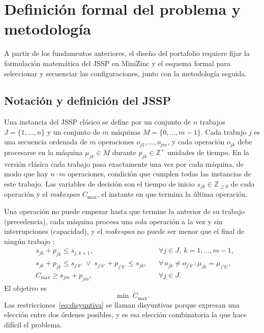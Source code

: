 \chapter{Definición formal del problema y metodología}
\label{cap:problema}

A partir de los fundamentos anteriores, el diseño del portafolio requiere fijar
la formulación matemática del JSSP en MiniZinc y el esquema formal para
seleccionar y secuenciar las configuraciones, junto con la metodología seguida.

\section{Notación y definición del JSSP}
\label{sec:notacion}

Una instancia del JSSP clásico se define por un conjunto de $n$ trabajos
$J = \{1, \dots, n\}$ y un conjunto de $m$ máquinas $M = \{0, \dots, m-1\}$.
Cada trabajo $j$ es una secuencia ordenada de $m$ operaciones
$o_{j1}, \dots, o_{jm}$, y cada operación $o_{jk}$ debe procesarse en la
máquina $\mu_{jk} \in M$ durante $p_{jk} \in \mathbb{Z}^{+}$ unidades de
tiempo. En la versión clásica cada trabajo pasa exactamente una vez por cada
máquina, de modo que hay $n \cdot m$ operaciones, condición que cumplen todas
las instancias de este trabajo. Las variables de decisión son el tiempo de
inicio $s_{jk} \in \mathbb{Z}_{\ge 0}$ de cada operación y el
\textit{makespan} $C_{\max}$, el instante en que termina la última operación.

Una operación no puede empezar hasta que termine la anterior de su trabajo
(precedencia), cada máquina procesa una sola operación a la vez y sin
interrupciones (capacidad), y el \textit{makespan} no puede ser menor que el
final de ningún trabajo \citep{pinedo2022}:
\begin{align}
  & s_{jk} + p_{jk} \le s_{j,k+1},
    && \forall j \in J,\ k = 1, \dots, m-1, \label{eq:precedencia} \\
  & s_{jk} + p_{jk} \le s_{j'k'} \;\lor\; s_{j'k'} + p_{j'k'} \le s_{jk},
    && \forall\, o_{jk} \ne o_{j'k'} : \mu_{jk} = \mu_{j'k'}, \label{eq:disyuntiva} \\
  & C_{\max} \ge s_{jm} + p_{jm}, && \forall j \in J. \label{eq:makespan}
\end{align}
El objetivo es
\begin{equation}
  \min\; C_{\max}.
  \label{eq:objetivo}
\end{equation}
Las restricciones~\eqref{eq:disyuntiva} se llaman disyuntivas porque expresan
una elección entre dos órdenes posibles, y es esa elección combinatoria la que
hace difícil el problema.

